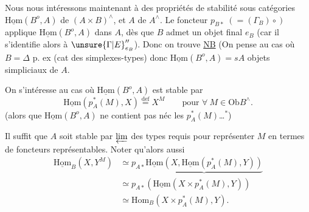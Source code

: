 Nous nous intéressons maintenant à des propriétés de stabilité  sous catégories \(\underline{\mathrm{Hom}}(B^o,A)\) de \((A\times B)^\wedge\), et \(A\) de \(A^\wedge\). Le foncteur \(p_{B*}\;(=(\Gamma_B)\circ)\) applique  \(\underline{\mathrm{Hom}}(B^o,A)\) dans \(A\), dès que \(B\) admet un objet final \(e_B\) (car il s'identifie alors à \(\unsure{\Gamma|E}_{e_B}''\)). Donc on trouve
\uline{NB} (On pense au cas où \(B=\Delta\) p. ex (cat des simplexes-types) donc \(\underline{\mathrm{Hom}}(B^o,A)=sA\) objets simpliciaux de \(A\).

 On s'intéresse  au cas où \(\underline{\mathrm{Hom}}(B^o,A)\) est stable par
\[\underline{\mathrm{Hom}}(p_A^*(M),X)\overset{\mathrm{def}}=X^M\qquad\text{pour }\forall\ M\in\mathrm{Ob}B^\wedge.\]
(alors que \(\underline{\mathrm{Hom}}(B^o,A)\) ne contient pas néc les \(p_A^*(M)\)\ldots\(^{*}\))

Il suffit que \(A\) soit stable par \(\varprojlim\) des types requis pour représenter \(M\)  en termes de foncteurs représentables.
Noter qu'alors aussi
\[
\begin{aligned}
\underline{\mathrm{Hom}}_B(X,Y^M)&\simeq p_{A*}\underbrace{\underline{\mathrm{Hom}}(X,\underline{\mathrm{Hom}}(p_A^*(M),Y))}\\
&\simeq p_{A*}(\underline{\mathrm{Hom}}(X\times p_A^*(M),Y))\\
&\simeq\mathrm{Hom}_B(X\times p_A^*(M),Y).
\end{aligned}
\]

